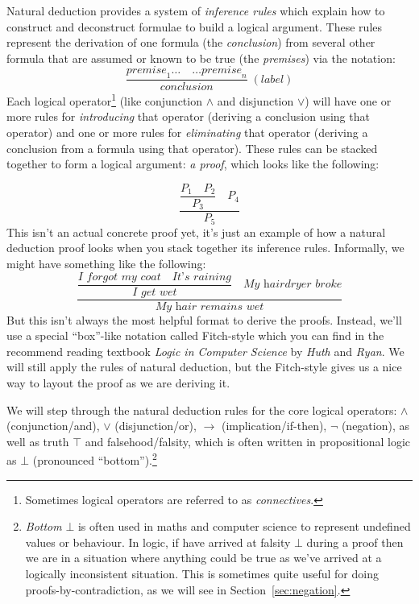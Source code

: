 \documentclass{article}
\theoremstyle{definition}
\begin{document}
Natural deduction provides a system of \emph{inference rules} which
explain how to construct and deconstruct formulae to build
a logical argument. These rules represent the derivation of one formula
(the \emph{conclusion}) from several other formula that are assumed or known to be true
(the \emph{premises}) via the notation:
%
\begin{equation*}
  \dfrac{\textit{premise}_1 \ldots \quad \ldots \textit{premise}_n}
        {\textit{conclusion}}
    \; {(\textit{label})}
\end{equation*}
%
Each logical operator\footnote{Sometimes logical operators are
  referred to as \emph{connectives}.} (like conjunction $\wedge$ and
disjunction $\vee$) will have one or more rules for \emph{introducing}
that operator (deriving a conclusion using that operator) and one or
more rules for \emph{eliminating} that operator (deriving a conclusion from a formula
using that operator). These rules can be stacked together to form a
logical argument: \emph{a proof}, which looks like the following:

\begin{equation*}
\dfrac{\dfrac{P_1 \quad P_2}{P_3} \quad P_4}{P_5}
\end{equation*}
%
This isn't an actual concrete proof yet, it's just an example of how
a natural deduction proof looks when you stack together
its inference rules. Informally, we might have something like the
following:
%
\begin{equation*}
\dfrac{\dfrac{\textit{I forgot my coat} \quad \textit{It's
      raining}}{\textit{I get wet}} \quad \textit{My hairdryer broke}}
       {\textit{My hair remains wet}}
\end{equation*}
%
But this isn't always the most helpful format to derive the
proofs. Instead, we'll use a special ``box''-like notation called
Fitch-style which you can find in the recommend reading textbook
\emph{Logic in Computer Science} by \emph{Huth} and \emph{Ryan}.
We will still apply the rules of natural deduction, but the Fitch-style
gives us a nice way to layout the proof as we are deriving it.

We will step through the natural deduction rules for the core logical
operators: $\wedge$ (conjunction/and), $\vee$ (disjunction/or),
$\rightarrow$ (implication/if-then), $\neg$ (negation), as well as
truth $\top$ and falsehood/falsity, which is often written in
propositional logic as $\bot$ (pronounced
``bottom'').\footnote{\emph{Bottom} $\bot$ is often used in maths and
  computer science to represent undefined values or behaviour. In
  logic, if have arrived at falsity $\bot$ during a proof then we are
  in a situation where anything could be true as we've arrived at a
  logically inconsistent situation. This is sometimes quite useful for
  doing proofs-by-contradiction, as we will see in
  Section~\ref{sec:negation}.}
\end{document}
